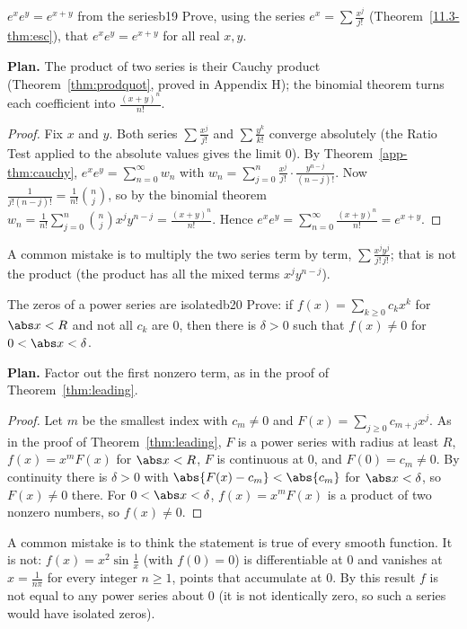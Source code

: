 \documentclass[11pt]{article}
\begin{document}
\begin{exmp}{$e^xe^y=e^{x+y}$ from the series}{b19}
Prove, using the series $e^x=\sum\frac{x^j}{j!}$ (Theorem~\ref{11.3-thm:esc}), that $e^xe^y=e^{x+y}$ for all real $x,y$.

\textbf{Plan.} The product of two series is their Cauchy product (Theorem~\ref{thm:prodquot}, proved in Appendix H); the binomial theorem turns each coefficient into $\frac{(x+y)^n}{n!}$.

\begin{proof}
Fix $x$ and $y$. Both series $\sum\frac{x^j}{j!}$ and $\sum\frac{y^k}{k!}$ converge absolutely (the Ratio Test applied to the absolute values gives the limit $0$). By Theorem~\ref{app-thm:cauchy}, $e^xe^y=\sum_{n=0}^\infty w_n$ with $w_n=\sum_{j=0}^n\frac{x^j}{j!}\cdot\frac{y^{n-j}}{(n-j)!}$. Now $\frac1{j!(n-j)!}=\frac1{n!}\binom nj$, so by the binomial theorem $w_n=\frac1{n!}\sum_{j=0}^n\binom njx^jy^{n-j}=\frac{(x+y)^n}{n!}$. Hence $e^xe^y=\sum_{n=0}^\infty\frac{(x+y)^n}{n!}=e^{x+y}$.
\end{proof}
A common mistake is to multiply the two series term by term, $\sum\frac{x^jy^j}{j!\,j!}$; that is not the product (the product has all the mixed terms $x^jy^{n-j}$).
\end{exmp}

\begin{exmp}{The zeros of a power series are isolated}{b20}
Prove: if $f(x)=\sum_{k\ge0}c_kx^k$ for $\abs x<R$ and not all $c_k$ are $0$, then there is $\delta>0$ such that $f(x)\ne0$ for $0<\abs x<\delta$.

\textbf{Plan.} Factor out the first nonzero term, as in the proof of Theorem~\ref{thm:leading}.

\begin{proof}
Let $m$ be the smallest index with $c_m\ne0$ and $F(x)=\sum_{j\ge0}c_{m+j}x^j$. As in the proof of Theorem~\ref{thm:leading}, $F$ is a power series with radius at least $R$, $f(x)=x^mF(x)$ for $\abs x<R$, $F$ is continuous at $0$, and $F(0)=c_m\ne0$. By continuity there is $\delta>0$ with $\abs{F(x)-c_m}<\abs{c_m}$ for $\abs x<\delta$, so $F(x)\ne0$ there. For $0<\abs x<\delta$, $f(x)=x^mF(x)$ is a product of two nonzero numbers, so $f(x)\ne0$.
\end{proof}
A common mistake is to think the statement is true of every smooth function. It is not: $f(x)=x^2\sin\frac1x$ (with $f(0)=0$) is differentiable at $0$ and vanishes at $x=\frac1{n\pi}$ for every integer $n\ge1$, points that accumulate at $0$. By this result $f$ is not equal to any power series about $0$ (it is not identically zero, so such a series would have isolated zeros).
\end{exmp}
\end{document}
